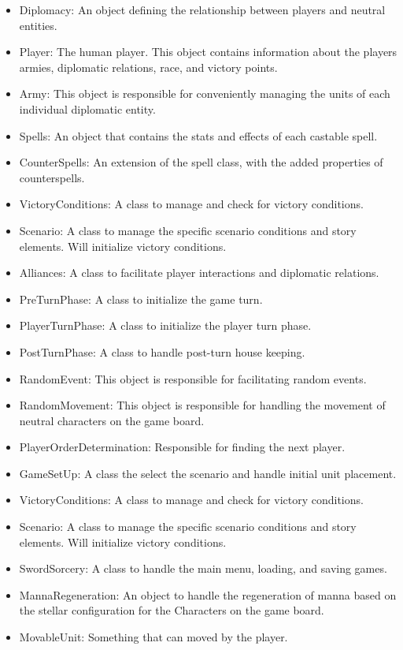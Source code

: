 \documentclass[12pt,a4paper]{article}
\begin{document}
\begin{itemize}
\item Diplomacy: An object defining the relationship between players and neutral entities.
\item Player: The human player. This object contains information about the players armies, diplomatic relations, race, and victory points.
\item Army: This object is responsible for conveniently managing the units of each individual diplomatic entity.
\item Spells: An object that contains the stats and effects of each castable spell.
\item CounterSpells: An extension of the spell class, with the added properties of counterspells.
\item VictoryConditions: A class to manage and check for victory conditions. 
\item Scenario: A class to manage the specific scenario conditions and story elements. Will initialize victory conditions.
\item Alliances: A class to facilitate player interactions and diplomatic relations.
\item PreTurnPhase: A class to initialize the game turn.
\item PlayerTurnPhase: A class to initialize the player turn phase.
\item PostTurnPhase: A class to handle post-turn house keeping.
\item RandomEvent: This object is responsible for facilitating random events.
\item RandomMovement: This object is responsible for handling the movement of neutral characters on the game board.
\item PlayerOrderDetermination: Responsible for finding the next player.
\item GameSetUp: A class the select the scenario and handle initial unit placement.
\item VictoryConditions: A class to manage and check for victory conditions. 
\item Scenario: A class to manage the specific scenario conditions and story elements. Will initialize victory conditions.
\item SwordSorcery: A class to handle the main menu, loading, and saving games.
\item MannaRegeneration: An object to handle the regeneration of manna based on the stellar configuration for the Characters on the game board.
\item MovableUnit: Something that can moved by the player. 
\end{itemize}
\pagebreak
\end{document}
